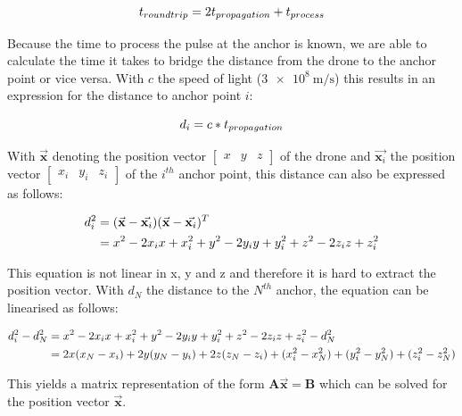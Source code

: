 \documentclass[a4paper]{article}        %
\begin{document}
		\begin{equation}
		\centering
			t_{roundtrip} = 2t_{propagation} + t_{process}
		\end{equation} 

		Because the time to process the pulse at the anchor is known, we are able to calculate the time it takes to bridge the distance from the drone to the anchor point or vice versa. With $c$ the speed of light ($\SI{3e8}{\meter\per\second}$) this results in an expression for the distance to anchor point $i$:

		\begin{equation}
		\centering
			d_i = c*t_{propagation}
		\end{equation}

		With $\vec{\textbf{x}}$ denoting the position vector $\begin{bmatrix} x & y & z \end{bmatrix}$ of the drone and $\vec{\textbf{x}_i}$ the position vector $\begin{bmatrix} x_i & y_i & z_i \end{bmatrix}$ of the $i^{th}$ anchor point, this distance can also be expressed as follows:

		\begin{align*}
		\centering
			d_i^2 &= (\vec{\textbf{x}} - \vec{\textbf{x}_i})(\vec{\textbf{x}} - \vec{\textbf{x}_i})^T \\
			&= x^2 - 2x_ix + x_i^2 + y^2 - 2y_iy + y_i^2 + z^2 - 2z_iz + z_i^2
		\end{align*}

		This equation is not linear in x, y and z and therefore it is hard to extract the position vector. With $d_N$ the distance to the $N^{th}$ anchor, the equation can be linearised as follows:

		\begin{align*}
		\centering
			d_i^2 - d_N^2 &= x^2 - 2x_ix + x_i^2 + y^2 - 2y_iy + y_i^2 + z^2 - 2z_iz + z_i^2 - d_N^2 \\
				&= 2x(x_N - x_i) + 2y(y_N - y_i) + 2z(z_N- z_i)+ (x_i^2 - x_N^2) + (y_i^2 - y_N^2)  + (z_i^2 - z_N^2) 
		\end{align*}

		This yields a matrix representation of the form $\textbf{A}\vec{\textbf{x}} = \textbf{B}$ which can be solved for the position vector $\vec{\textbf{x}}$.


\end{document}
